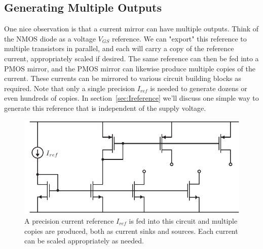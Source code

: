 \subsection{Generating Multiple Outputs}
One nice observation is that a current mirror can have multiple outputs.  Think of the NMOS diode as a voltage $V_{GS}$ reference.  We can "export" this reference to multiple transistors in parallel, and each will carry a copy of the reference current, appropriately scaled if desired.  The same reference can then be fed into a PMOS mirror, and the PMOS mirror can likewise produce multiple copies of the current.  These currents can be mirrored to various circuit building blocks as required.  Note that only a single precision $I_{ref}$ is needed to generate dozens or even hundreds of copies.  In section~\ref{sec:Ireference} we'll discuss one simple way to generate this reference that is independent of the supply voltage.
\begin{figure}[tb]
\centering
\includegraphics[scale=1]{19current_mirror_multioutput.pdf}
\caption{A precision current reference $I_{ref}$ is fed into this circuit and multiple copies are produced, both as current sinks and sources.  Each current can be scaled appropriately as needed.} \label{fig:19current_mirror_multioutput.pdf}
\end{figure}
